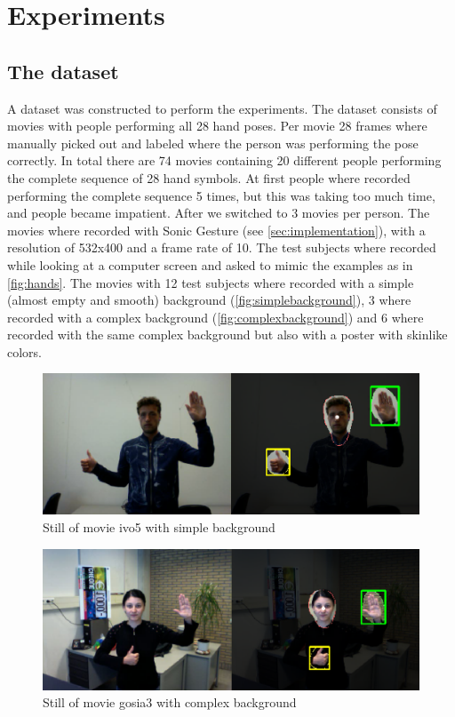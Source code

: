 
\chapter{Experiments}
\label{ch:experiments}


\section{The dataset}
A dataset was constructed to perform the experiments. The dataset consists of movies with people performing all 28 hand poses. Per movie 28 frames where manually picked out and labeled where the person was performing the pose correctly. In total there are 74 movies containing 20 different people performing the complete sequence of 28 hand symbols. At first people where recorded performing the complete sequence 5 times, but this was taking too much time, and people became impatient. After we switched to 3 movies per person. The movies where recorded with Sonic Gesture (see \autoref{sec:implementation}), with a resolution of 532x400 and a frame rate of 10. The test subjects where recorded while looking at a computer screen and asked to mimic the examples as in \autoref{fig:hands}. The movies with 12 test subjects where recorded with a simple (almost empty and smooth) background (\autoref{fig:simplebackground}), 3 where recorded with a complex background (\autoref{fig:complexbackground}) and 6 where recorded with the same complex background but also with a poster with skinlike colors.

\begin{figure}[htbp]
\center{}
\includegraphics[width=0.8\linewidth]{figures/simple.png}
\caption{Still of movie ivo5 with simple background}
\label{fig:simplebackground}
\end{figure}

\begin{figure}[htbp]
\center{}
\includegraphics[width=0.8\linewidth]{figures/complex.png}
\caption{Still of movie gosia3 with complex background}
\label{fig:complexbackground}
\end{figure}

